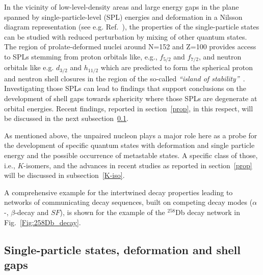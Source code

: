 In the vicinity of low-level-density areas and large energy gaps in the plane spanned by single-particle-level (SPL) energies and deformation in a Nilsson diagram 
representation (see e.g. Ref.~\cite{Chasman1977}), the properties of the single-particle states can be studied with reduced perturbation by mixing of other quantum states. 
The region of prolate-deformed nuclei around N=152 and Z=100 provides access to SPLs stemming from proton orbitals 
like, e.g., $f_{5/2}$ and $f_{7/2}$, and neutron orbitals like e.g. $d_{3/2}$ and $h_{11/2}$ which are predicted to form the spherical proton and neutron 
shell closures in the region of the so-called {\it ``island of stability''}~\cite{Chasman1977}. 
Investigating those SPLs can lead to findings that support conclusions on the development of shell gaps towards sphericity where those SPLs are degenerate at orbital energies.
Recent findings, reported in section~\ref{prop}, in this respect, will be discussed in the next subsection~\ref{spl}.

As mentioned above, the unpaired nucleon plays a major role here as a probe for the development of specific quantum states with deformation and single particle energy and the possible occurrence of metastable states. 
A specific class of those, i.e., $K$-isomers, and the advances in recent studies as reported in section~\ref{prop} will be discussed in subsection~\ref{K-iso}.

A comprehensive example for the intertwined decay properties leading to networks of communicating decay sequences, built on competing decay modes ($\alpha$-, $\beta$-decay and $SF$), is shown for the example of the $^{258}$Db decay network in Fig.~\ref{Fig:258Db_decay}.  


\subsection{Single-particle states, deformation and shell gaps}\label{spl}

